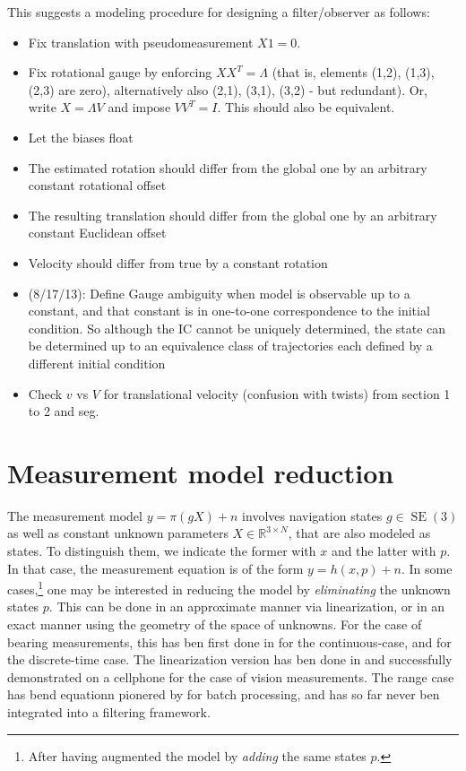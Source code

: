 \documentclass[]{article}
\def\real{\mathbb{R}}
\def\SE{\operatorname{SE}}
\begin{document}
This suggests a modeling procedure for designing a filter/observer as follows:
\begin{itemize}
\item Fix translation with pseudomeasurement $X 1 = 0$.
\item Fix rotational gauge by enforcing $X X^T = \Lambda$ (that is, elements (1,2), (1,3), (2,3) are zero), alternatively also (2,1), (3,1), (3,2) - but redundant). Or, write $X = \Lambda V$ and impose $V V^T = I$. This should also be equivalent.
\item Let the biases float
\item The estimated rotation should differ from the global one by an arbitrary constant rotational offset
\item The resulting translation should differ from the global one by an arbitrary constant Euclidean offset
\item Velocity should differ from true by a constant rotation
\item (8/17/13): Define Gauge ambiguity when model is observable up to a constant, and that constant is in one-to-one correspondence to the initial condition. So although the IC cannot be uniquely determined, the state can be determined up to an equivalence class of trajectories each defined by a different initial condition
\item Check $v$ vs $V$ for translational velocity (confusion with twists) from section 1 to 2 and seg.
\end{itemize}


\section{Measurement model reduction}

The measurement model $y = \pi(gX)+n$ involves navigation states $g\in \SE(3)$ as well as constant unknown parameters $X\in \real^{3\times N}$, that are also modeled as states. To distinguish them, we indicate the former with $x$ and the latter with $p$. In that case, the measurement equation is of the form $y = h(x,p) +n$. In some cases,\footnote{After having augmented the model by {\em adding} the same states $p$.} one may be interested in reducing the model by {\em eliminating} the unknown states $p$. This can be done in an approximate manner via linearization, or in an exact manner using the geometry of the space of unknowns. For the case of bearing measurements, this has ben first done in \cite{soattoP97IJCV} for the continuous-case, and \cite{soattoFP96,soattoP98PAMI1,soattoP98PAMI2} for the discrete-time case. The linearization version has ben done in \cite{mourikisR07} and successfully demonstrated on a cellphone for the case of vision measurements. The range case has bend{
equation}n pionered by \cite{
ferraraA09} for batch processing, and has so far never ben integrated into a filtering framework.
\end{document}

